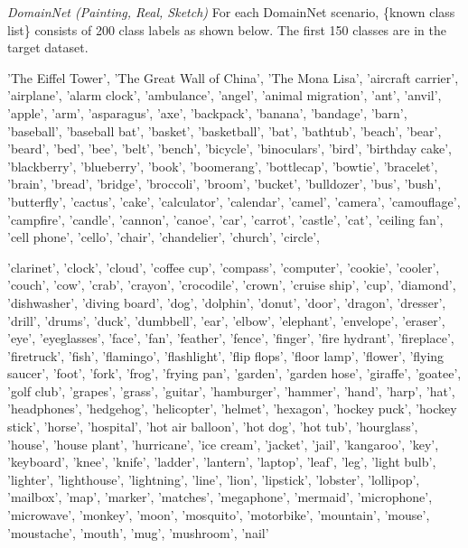\documentclass[10pt]{article} %
\begin{document}
{\em DomainNet (Painting, Real, Sketch)}
For each DomainNet scenario, \{known class list\} consists of 200 class labels as shown below. The first 150 classes are in the target dataset.
\begin{promptquote}
    'The Eiffel Tower', 'The Great Wall of China', 'The Mona Lisa', 'aircraft carrier', 'airplane', 'alarm clock', 
        'ambulance', 'angel', 'animal migration', 'ant', 'anvil', 'apple', 'arm', 'asparagus', 'axe', 'backpack', 
        'banana', 'bandage', 'barn', 'baseball', 'baseball bat', 'basket', 'basketball', 'bat', 'bathtub', 
        'beach', 'bear', 'beard', 'bed', 'bee', 'belt', 'bench', 'bicycle', 'binoculars', 'bird', 'birthday cake', 
        'blackberry', 'blueberry', 'book', 'boomerang', 'bottlecap', 'bowtie', 'bracelet', 'brain', 'bread', 'bridge', 
        'broccoli', 'broom', 'bucket', 'bulldozer', 'bus', 'bush', 'butterfly', 'cactus', 'cake', 'calculator', 
        'calendar', 'camel', 'camera', 'camouflage', 'campfire', 'candle', 'cannon', 'canoe', 'car', 'carrot', 
        'castle', 'cat', 'ceiling fan', 'cell phone', 'cello', 'chair', 'chandelier', 'church', 'circle', 
\end{promptquote}
\begin{promptquote}
        'clarinet', 'clock', 'cloud', 'coffee cup', 'compass', 'computer', 'cookie', 'cooler', 'couch', 
        'cow', 'crab', 'crayon', 'crocodile', 'crown', 'cruise ship', 'cup', 'diamond', 'dishwasher', 
        'diving board', 'dog', 'dolphin', 'donut', 'door', 'dragon', 'dresser', 'drill', 'drums', 
        'duck', 'dumbbell', 'ear', 'elbow', 'elephant', 'envelope', 'eraser', 'eye', 'eyeglasses', 
        'face', 'fan', 'feather', 'fence', 'finger', 'fire hydrant', 'fireplace', 'firetruck', 
        'fish', 'flamingo', 'flashlight', 'flip flops', 'floor lamp', 'flower', 'flying saucer',
        'foot', 'fork', 'frog', 'frying pan', 'garden', 'garden hose', 'giraffe', 'goatee', 
        'golf club', 'grapes', 'grass', 'guitar', 'hamburger', 'hammer', 'hand', 'harp', 'hat', 'headphones', 
        'hedgehog', 'helicopter', 'helmet', 'hexagon', 'hockey puck', 'hockey stick', 'horse', 'hospital', 
        'hot air balloon', 'hot dog', 'hot tub', 'hourglass', 'house', 'house plant', 'hurricane', 'ice cream', 
        'jacket', 'jail', 'kangaroo', 'key', 'keyboard', 'knee', 'knife', 'ladder', 'lantern', 'laptop', 'leaf', 
        'leg', 'light bulb', 'lighter', 'lighthouse', 'lightning', 'line', 'lion', 'lipstick', 'lobster', 'lollipop', 
        'mailbox', 'map', 'marker', 'matches', 'megaphone', 'mermaid', 'microphone', 'microwave', 'monkey', 'moon', 
        'mosquito', 'motorbike', 'mountain', 'mouse', 'moustache', 'mouth', 'mug', 'mushroom', 'nail'
\end{promptquote}
\end{document}
